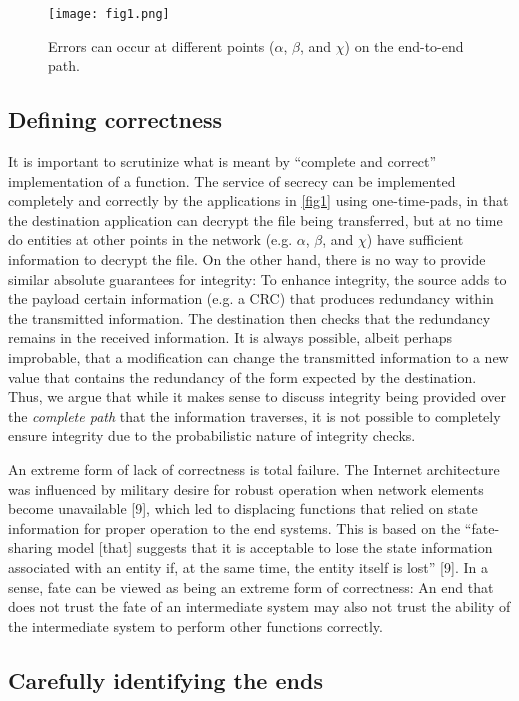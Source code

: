 \documentclass[a4paper,11pt,notitlepage,twoside,openright]{article}
\begin{document}
\begin{figure}
  \centering
  \texttt{[image: fig1.png]}
  \caption{Errors can occur at different points ($\alpha$, $\beta$, and $\chi$) on the
end-to-end path.\label{fig1}}
\end{figure}

\hypertarget{defining-correctness}{%
\subsection{Defining correctness}}

It is important to scrutinize what is meant by ``complete and correct''
implementation of a function. The service of secrecy can be implemented
completely and correctly by the applications in \autoref{fig1} using
one-time-pads, in that the destination application can decrypt the file
being transferred, but at no time do entities at other points in the
network (e.g. $\alpha$, $\beta$, and $\chi$) have sufficient information to decrypt the
file. On the other hand, there is no way to provide similar absolute
guarantees for integrity: To enhance integrity, the source adds to the
payload certain information (e.g. a CRC) that produces redundancy within
the transmitted information. The destination then checks that the
redundancy remains in the received information. It is always possible,
albeit perhaps improbable, that a modification can change the
transmitted information to a new value that contains the redundancy of
the form expected by the destination. Thus, we argue that while it makes
sense to discuss integrity being provided over the \emph{complete path}
that the information traverses, it is not possible to completely ensure
integrity due to the probabilistic nature of integrity checks.

An extreme form of lack of correctness is total failure. The Internet
architecture was influenced by military desire for robust operation when
network elements become unavailable {[}9{]}, which led to displacing
functions that relied on state information for proper operation to the
end systems. This is based on the ``fate-sharing model {[}that{]}
suggests that it is acceptable to lose the state information associated
with an entity if, at the same time, the entity itself is lost''
{[}9{]}. In a sense, fate can be viewed as being an extreme form of
correctness: An end that does not trust the fate of an intermediate
system may also not trust the ability of the intermediate system to
perform other functions correctly.

\hypertarget{carefully-identifying-the-ends}{%
\subsection{Carefully identifying the ends
}\label{carefully-identifying-the-ends}}
\end{document}
